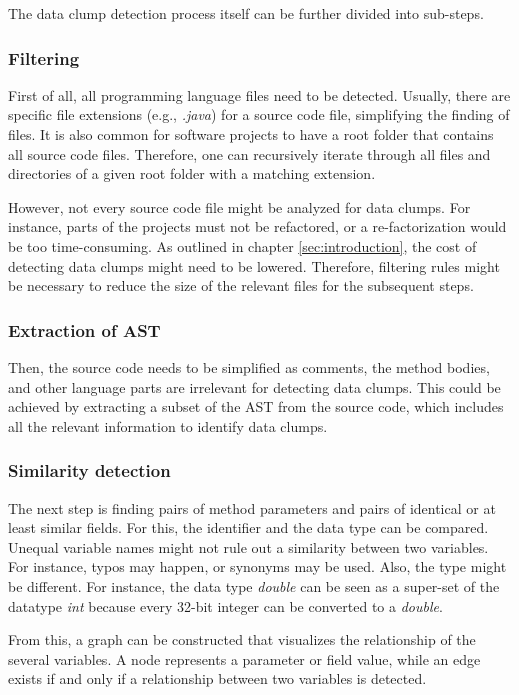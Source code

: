 The data clump detection process itself can be further divided into sub-steps.
\subsubsection{Filtering}\label{subsub:filtering_files}
First of all, all programming language files need to be detected. Usually, there are specific file extensions (e.g., \textit{.java}) for a source code file, simplifying the finding of files. It is also common for software projects to have a root folder that contains all source code files. Therefore, one can recursively iterate through all files and directories of a given root folder with a matching extension. 

However, not every source code file might be analyzed for data clumps. For instance, parts of the projects must not be refactored, or a re-factorization would be too time-consuming. As outlined in chapter \ref{sec:introduction}, the cost of detecting data clumps might need to be lowered. Therefore, filtering rules might be necessary to reduce the size of the relevant files for the subsequent steps.  

\subsubsection{Extraction of AST}
Then,  the source code needs to be simplified as comments, the method bodies, and other language parts are irrelevant for detecting data clumps. This could be achieved by extracting a subset of the \ac{AST} from the source code, which includes all the relevant information to identify data clumps.
\subsubsection{Similarity detection}

The next step is finding pairs of method parameters and pairs of identical or at least similar fields. For this, the identifier and the data type can be compared. Unequal variable names might not rule out a similarity between two variables. For instance, typos may happen, or synonyms may be used. Also, the type might be different. For instance, the data type \textit{double} can be seen as a super-set of the datatype \textit{int} because every 32-bit integer can be converted to a \textit{double}.

From this, a graph can be constructed that visualizes the relationship of the several variables. A node represents a parameter or field value, while an edge exists if and only if a relationship between two variables is detected. 

